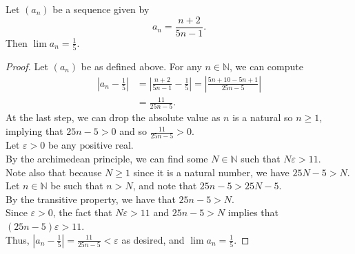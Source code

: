 \documentclass{article}
\newenvironment{theorem}[1]{\renewcommand\theinnercustomthm{#1}\innercustomthm}
  {\endinnercustomthm}
\begin{document}
\newpage{}
\begin{theorem}{7}
    Let $(a_n)$ be a sequence given by \[a_n = \frac{n+2}{5n-1}.\]
    Then $\lim a_n = \frac{1}{5}$.
\end{theorem}
\begin{proof}
    Let $(a_n)$ be as defined above. For any $n \in \mathbb N$, we can compute \begin{align*}
        \left|a_n - \frac{1}{5}\right| &= \left|\frac{n+2}{5n-1} - \frac{1}{5}\right| = \left|\frac{5n+10-5n+1}{25n-5}\right| \\
        &= \frac{11}{25n-5}.
    \end{align*}
    At the last step, we can drop the absolute value as $n$ is a natural so $n \ge 1$, implying that $25 n - 5 > 0$ and so $\frac{11}{25n-5} > 0$. \\
    Let $\varepsilon > 0$ be any positive real.  \\
    By the archimedean principle, we can find some $N \in \mathbb N$ such that $N \varepsilon > 11$. \\
    Note also that because $N\ge 1$ since it is a natural number, we have $25 N - 5 > N$. \\ Let $n \in \mathbb N$ be such that $n > N$, and note that $25 n - 5 > 25 N - 5$. \\ By the transitive property, we have that $25 n - 5 > N$. \\ Since $\varepsilon > 0$, the fact that $N \varepsilon > 11$ and $25 n - 5 > N$ implies that $(25 n - 5) \varepsilon > 11$. \\
    Thus, $\left|a_n - \frac{1}{5} \right|=\frac{11}{25n-5} < \varepsilon$ as desired, and $\lim a_n = \frac{1}{5}$.
\end{proof}
\end{document}
